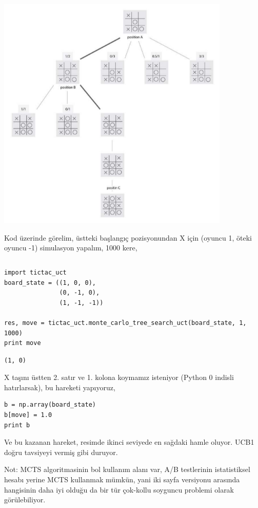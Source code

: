 \documentclass[12pt,fleqn]{article}\usepackage{../../common}
\begin{document}
\includegraphics[width=30em]{mcts_02.png} 

Kod üzerinde görelim, üstteki başlangıç pozisyonundan X için (oyuncu 1,
öteki oyuncu -1) simulasyon yapalım, 1000 kere,

\inputminted[fontsize=\footnotesize]{python}{tictac_uct.py}

\begin{verbatim}
import tictac_uct
board_state = ((1, 0, 0),
               (0, -1, 0),
               (1, -1, -1))

res, move = tictac_uct.monte_carlo_tree_search_uct(board_state, 1, 1000)
print move
\end{verbatim}

\begin{verbatim}
(1, 0)
\end{verbatim}

X taşını üstten 2. satır ve 1. kolona koymamız isteniyor (Python 0 indisli
hatırlarsak), bu hareketi yapıyoruz,

\begin{verbatim}
b = np.array(board_state)
b[move] = 1.0
print b
\end{verbatim}

Ve bu kazanan hareket, resimde ikinci seviyede en sağdaki hamle
oluyor. UCB1 doğru tavsiyeyi vermiş gibi duruyor.

Not: MCTS algoritmasinin bol kullanım alanı var, A/B testlerinin
istatistiksel hesabı yerine MCTS kullanmak mümkün, yani iki sayfa versiyonu
arasında hangisinin daha iyi olduğu da bir tür çok-kollu soyguncu problemi
olarak görülebiliyor. 
\end{document}
